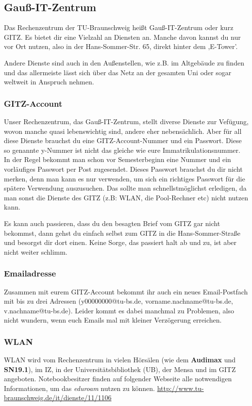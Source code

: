 \subsection{Gauß-IT-Zentrum}

	Das Rechenzentrum der TU-Braunschweig heißt Gauß-IT-Zentrum oder kurz GITZ. Es bietet dir eine Vielzahl an Diensten an. Manche davon kannst du nur vor Ort nutzen, also in der Hans-Sommer-Str. 65, direkt hinter dem ,E-Tower'. 
	
	Andere Dienste sind auch in den Außenstellen, wie z.B. im
	Altgebäude zu finden und das allermeiste lässt sich über das Netz an der gesamten Uni oder sogar weltweit in Anspruch nehmen.

\subsubsection{GITZ-Account}
\label{todogitz}
	Unser Rechenzentrum, das Gauß-IT-Zentrum, stellt  diverse Dienste zur Vefügung, wovon manche quasi lebenswichtig sind, andere eher nebensächlich. Aber für all diese Dienste brauchst du eine GITZ-Account-Nummer und ein Passwort. Diese so genannte y-Nummer ist nicht das gleiche wie eure Immatrikulationsnummer. In der Regel bekommt man schon vor Semesterbeginn eine Nummer und ein vorläufiges Passwort per Post zugesendet. Dieses Passwort brauchst du dir nicht merken, denn man kann es nur verwenden, um  sich ein richtiges Passwort für die spätere Verwendung auszusuchen. Das sollte man schnellstmöglichst erledigen, da man sonst die Dienste des GITZ (z.B: WLAN, die Pool-Rechner etc) nicht nutzen kann. 
	
	Es kann auch passieren, dass du den besagten Brief vom GITZ  gar nicht bekommst, dann gehst du einfach selbst zum GITZ in die Hans-Sommer-Straße und besorgst dir dort einen. Keine Sorge, das passiert halt ab und zu, ist aber nicht weiter schlimm.

	\subsubsection{Emailadresse}
		Zusammen mit eurem GITZ-Account bekommt ihr auch ein neues Email-Postfach mit bis zu drei Adressen (y00000000@tu-bs.de, vorname.nachname@tu-bs.de, v.nachname@tu-bs.de). Leider kommt es dabei manchmal zu Problemen, also nicht wundern, wenn euch Emails mal mit kleiner Verzögerung erreichen. 

	\subsubsection{WLAN}
		\label{wlan}
		WLAN wird vom Rechenzentrum in vielen Hörsälen (wie dem \textbf{Audimax} und \textbf{SN19.1}), im IZ, in der Universitätsbibliothek (UB), der Mensa und im GITZ angeboten. Notebookbesitzer finden auf folgender Webseite alle notwendigen Informationen, um das \emph{eduroam} nutzen zu können. \url{http://www.tu-braunschweig.de/it/dienste/11/1106}


